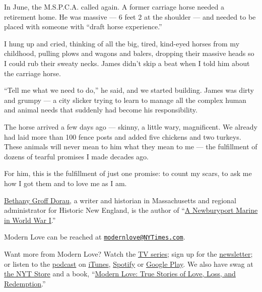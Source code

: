 In June, the M.S.P.C.A. called again. A former carriage horse needed a
retirement home. He was massive --- 6 feet 2 at the shoulder --- and
needed to be placed with someone with ``draft horse experience.''

I hung up and cried, thinking of all the big, tired, kind-eyed horses
from my childhood, pulling plows and wagons and balers, dropping their
massive heads so I could rub their sweaty necks. James didn't skip a
beat when I told him about the carriage horse.

``Tell me what we need to do,'' he said, and we started building. James
was dirty and grumpy --- a city slicker trying to learn to manage all
the complex human and animal needs that suddenly had become his
responsibility.

The horse arrived a few days ago --- skinny, a little wary, magnificent.
We already had laid more than 100 fence posts and added five chickens
and two turkeys. These animals will never mean to him what they mean to
me --- the fulfillment of dozens of tearful promises I made decades ago.

For him, this is the fulfillment of just one promise: to count my scars,
to ask me how I got them and to love me as I am.

\href{https://bethanygroffdorau.com/}{Bethany Groff Dorau}, a writer and
historian in Massachusetts and regional administrator for Historic New
England, is the author of
``\href{https://bethanygroffdorau.com/product/a-newburyport-marine-in-world-war-one/}{A
Newburyport Marine in World War I}.''

Modern Love can be reached at
\href{mailto:modernlove@NYTimes.com}{\nolinkurl{modernlove@NYTimes.com}}.

Want more from Modern Love? Watch the
\href{https://www.nytimes3xbfgragh.onion/2019/09/12/style/modern-love-tv-show-trailer.html}{TV
series}; sign up for the
\href{https://www.nytimes3xbfgragh.onion/newsletters/love-letter}{newsletter};
or listen to the
\href{https://www.nytimes3xbfgragh.onion/column/modern-love-podcast}{podcast}
on
\href{https://itunes.apple.com/us/podcast/modern-love/id1065559535?mt=2\&version=meter+at+0\&module=meter-Links\&pgtype=article\&contentId=\&mediaId=\&referrer=\&priority=true\&action=click\&contentCollection=meter-links-click}{iTunes},
\href{https://open.spotify.com/show/03Er7mSPq9IEewOgbPD3vO}{Spotify} or
\href{https://play.google.com/music/listen?u=0\#/ps/Iktqjbkz7bychbnofblw32dik64}{Google
Play}. We also have swag at
\href{https://store.nytimes3xbfgragh.onion/collections/modern-love}{the
NYT Store} and a book,
``\href{https://www.penguinrandomhouse.com/books/623036/modern-love-revised-and-updated-by-edited-by-daniel-jones-with-contributions-by-andrew-rannells-ayelet-waldman-amy-krouse-rosenthal-veronica-chambers-and-more/}{Modern
Love: True Stories of Love, Loss, and Redemption}.''

